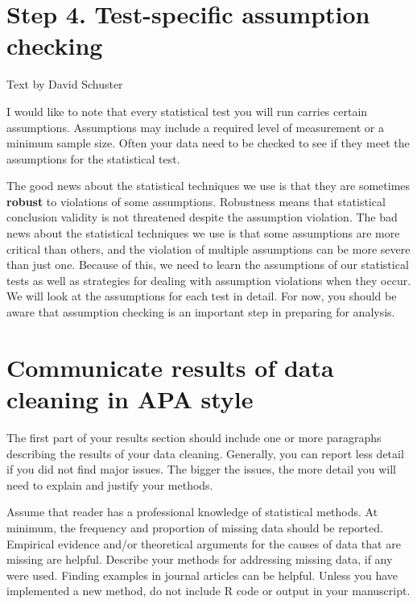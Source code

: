 \documentclass[
]{book}
\begin{document}
\hypertarget{step-4.-test-specific-assumption-checking}{%
\section{Step 4. Test-specific assumption checking}\label{step-4.-test-specific-assumption-checking}}

Text by David Schuster

I would like to note that every statistical test you will run carries certain assumptions. Assumptions may include a required level of measurement or a minimum sample size. Often your data need to be checked to see if they meet the assumptions for the statistical test.

The good news about the statistical techniques we use is that they are sometimes \textbf{robust} to violations of some assumptions. Robustness means that statistical conclusion validity is not threatened despite the assumption violation. The bad news about the statistical techniques we use is that some assumptions are more critical than others, and the violation of multiple assumptions can be more severe than just one. Because of this, we need to learn the assumptions of our statistical tests as well as strategies for dealing with assumption violations when they occur. We will look at the assumptions for each test in detail. For now, you should be aware that assumption checking is an important step in preparing for analysis.

\hypertarget{communicate-results-of-data-cleaning-in-apa-style}{%
\section{Communicate results of data cleaning in APA style}\label{communicate-results-of-data-cleaning-in-apa-style}}

The first part of your results section should include one or more paragraphs describing the results of your data cleaning. Generally, you can report less detail if you did not find major issues. The bigger the issues, the more detail you will need to explain and justify your methods.

Assume that reader has a professional knowledge of statistical methods. At minimum, the frequency and proportion of missing data should be reported. Empirical evidence and/or theoretical arguments for the causes of data that are missing are helpful. Describe your methods for addressing missing data, if any were used. Finding examples in journal articles can be helpful. Unless you have implemented a new method, do not include R code or output in your manuscript.
\end{document}
